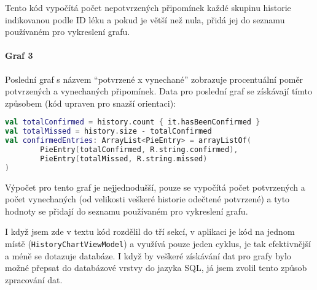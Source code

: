 \documentclass[../TakeYourPill.tex]{subfiles}
\begin{document}
Tento kód vypočítá počet nepotvrzených připomínek každé skupinu historie indikovanou podle ID léku a pokud je větší než nula, přidá jej do seznamu používaném pro vykreslení grafu.


\paragraph{Graf 3} Poslední graf s názvem \enquote{potvrzené x vynechané} zobrazuje procentuální poměr potvrzených a vynechaných připomínek. Data pro poslední graf se získávají tímto způsobem (kód upraven pro snazší orientaci):

\setmonofont{JetBrains Mono}
\begin{lstlisting}[language=Kotlin]
val totalConfirmed = history.count { it.hasBeenConfirmed }
val totalMissed = history.size - totalConfirmed
val confirmedEntries: ArrayList<PieEntry> = arrayListOf(
        PieEntry(totalConfirmed, R.string.confirmed),
        PieEntry(totalMissed, R.string.missed)
)
\end{lstlisting}
\setmonofont{Latin Modern Mono}

Výpočet pro tento graf je nejjednodušší, pouze se vypočítá počet potvrzených a počet vynechaných (od velikosti veškeré historie odečtené potvrzené) a tyto hodnoty se přidají do seznamu používaném pro vykreslení grafu.

I když jsem zde v textu kód rozdělil do tří sekcí, v aplikaci je kód na jednom místě (\texttt{HistoryChartViewModel}) a využívá pouze jeden cyklus, je tak efektivnější a méně se dotazuje databáze. I když by veškeré získávání dat pro grafy bylo možné přepsat do databázové vrstvy do jazyka SQL, já jsem zvolil tento způsob zpracování dat.
\end{document}
